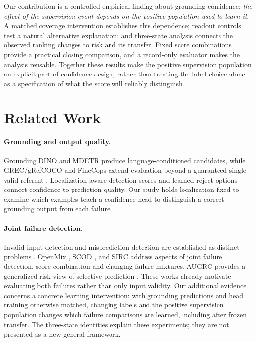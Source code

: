 \documentclass[10pt,twocolumn,letterpaper]{article}
\begin{document}
Our contribution is a controlled empirical finding about grounding confidence:
\emph{the effect of the supervision event depends on the positive population
used to learn it}. A matched coverage intervention establishes this dependence;
readout controls test a natural alternative explanation; and three-state
analysis connects the observed ranking changes to risk and its transfer.
Fixed score combinations provide a practical closing comparison, and a
record-only evaluator makes the analysis reusable. Together these results
make the positive supervision population an explicit part of confidence
design, rather than treating the label choice alone as a specification of
what the score will reliably distinguish.

\section{Related Work}
\paragraph{Grounding and output quality.}
Grounding DINO \cite{liu2025groundingdino} and MDETR
\cite{kamath2021mdetr} produce language-conditioned candidates, while
GREC/gRefCOCO and FineCops extend evaluation beyond a guaranteed single
valid referent \cite{he2023grec,liu2023gres,liu2024finecops}. Localization-aware
detection scores \cite{li2020gfl} and learned reject options
\cite{geifman2019selectivenet} connect confidence to prediction quality.
Our study holds localization fixed to examine which examples teach a
confidence head to distinguish a correct grounding output from each failure.

\paragraph{Joint failure detection.}
Invalid-input detection and misprediction detection are established as
distinct problems \cite{jaeger2023failure}. OpenMix
\cite{zhu2023openmix}, SCOD \cite{narasimhan2024scod}, and SIRC
\cite{xia2024sirc} address aspects of joint failure detection, score
combination and changing failure mixtures. AUGRC provides a generalized-risk
view of selective prediction \cite{traub2024augrc}. These works already
motivate evaluating both failures rather than only input validity.
Our additional evidence concerns a concrete learning intervention: with
grounding predictions and head training otherwise matched, changing labels
and the positive supervision population changes which failure comparisons
are learned, including after frozen transfer. The three-state identities
explain these experiments; they are not presented as a new general framework.
\end{document}
